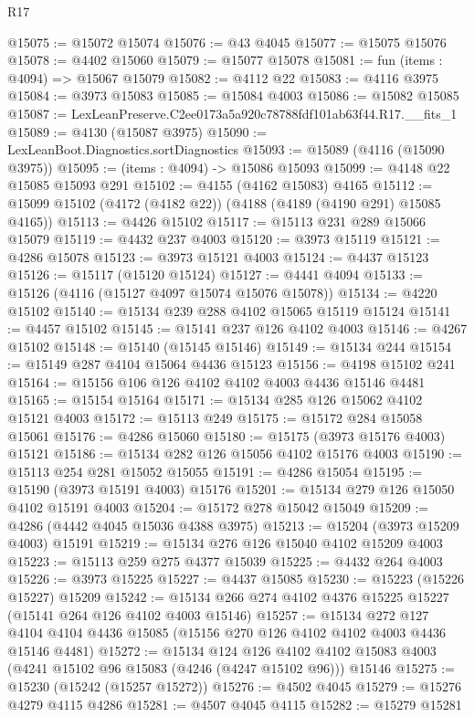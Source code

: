 \begin{lexlean}{R17}
\begin{coremodule}
@15075 := @15072 @15074
@15076 := @43 @4045
@15077 := @15075 @15076
@15078 := @4402 @15060
@15079 := @15077 @15078
@15081 := fun (items : @4094) => @15067 @15079
@15082 := @4112 @22
@15083 := @4116 @3975
@15084 := @3973 @15083
@15085 := @15084 @4003
@15086 := @15082 @15085
@15087 := LexLeanPreserve.C2ee0173a5a920c78788fdf101ab63f44.R17.__fits_1
@15089 := @4130 (@15087 @3975)
@15090 := LexLeanBoot.Diagnostics.sortDiagnostics
@15093 := @15089 (@4116 (@15090 @3975))
@15095 := (items : @4094) -> @15086 @15093
@15099 := @4148 @22 @15085 @15093 @291
@15102 := @4155 (@4162 @15083) @4165
@15112 := @15099 @15102 (@4172 (@4182 @22)) (@4188 (@4189 (@4190 @291) @15085 @4165))
@15113 := @4426 @15102
@15117 := @15113 @231 @289 @15066 @15079
@15119 := @4432 @237 @4003
@15120 := @3973 @15119
@15121 := @4286 @15078
@15123 := @3973 @15121 @4003
@15124 := @4437 @15123
@15126 := @15117 (@15120 @15124)
@15127 := @4441 @4094
@15133 := @15126 (@4116 (@15127 @4097 @15074 @15076 @15078))
@15134 := @4220 @15102
@15140 := @15134 @239 @288 @4102 @15065 @15119 @15124
@15141 := @4457 @15102
@15145 := @15141 @237 @126 @4102 @4003
@15146 := @4267 @15102
@15148 := @15140 (@15145 @15146)
@15149 := @15134 @244
@15154 := @15149 @287 @4104 @15064 @4436 @15123
@15156 := @4198 @15102 @241
@15164 := @15156 @106 @126 @4102 @4102 @4003 @4436 @15146 @4481
@15165 := @15154 @15164
@15171 := @15134 @285 @126 @15062 @4102 @15121 @4003
@15172 := @15113 @249
@15175 := @15172 @284 @15058 @15061
@15176 := @4286 @15060
@15180 := @15175 (@3973 @15176 @4003) @15121
@15186 := @15134 @282 @126 @15056 @4102 @15176 @4003
@15190 := @15113 @254 @281 @15052 @15055
@15191 := @4286 @15054
@15195 := @15190 (@3973 @15191 @4003) @15176
@15201 := @15134 @279 @126 @15050 @4102 @15191 @4003
@15204 := @15172 @278 @15042 @15049
@15209 := @4286 (@4442 @4045 @15036 @4388 @3975)
@15213 := @15204 (@3973 @15209 @4003) @15191
@15219 := @15134 @276 @126 @15040 @4102 @15209 @4003
@15223 := @15113 @259 @275 @4377 @15039
@15225 := @4432 @264 @4003
@15226 := @3973 @15225
@15227 := @4437 @15085
@15230 := @15223 (@15226 @15227) @15209
@15242 := @15134 @266 @274 @4102 @4376 @15225 @15227 (@15141 @264 @126 @4102 @4003 @15146)
@15257 := @15134
    @272
    @127
    @4104
    @4104
    @4436
    @15085
    (@15156 @270 @126 @4102 @4102 @4003 @4436 @15146 @4481)
@15272 := @15134
    @124
    @126
    @4102
    @4102
    @15083
    @4003
    (@4241 @15102 @96 @15083 (@4246 (@4247 @15102 @96)))
    @15146
@15275 := @15230 (@15242 (@15257 @15272))
@15276 := @4502 @4045
@15279 := @15276 @4279 @4115 @4286
@15281 := @4507 @4045 @4115
@15282 := @15279 @15281

\end{coremodule}
\end{lexlean}

